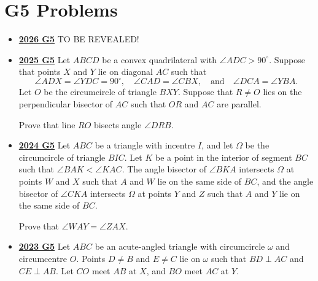 \documentclass[11pt]{scrartcl}
\begin{document}
\section*{G5 Problems}  \label{G5}
\begin{itemize}[leftmargin=*]


\item \href{https://www.imo-official.org/assets/documents/problems/2026/IMO2026SL.pdf}{\textbf{2026 G5}} TO BE REVEALED!

\item \href{https://artofproblemsolving.com/community/c6h3866849p38676933}{\textbf{2025 G5}} Let $ABCD$ be a convex quadrilateral with $\angle ADC > 90^\circ$. Suppose that points $X$ and $Y$ lie on diagonal $AC$ such that 
    \[ \angle ADX = \angle YDC = 90^\circ, \quad \angle CAD = \angle CBX, \quad \text{and} \quad \angle DCA = \angle YBA. \]
    Let $O$ be the circumcircle of triangle $BXY$. Suppose that $R\ne O$ lies on the perpendicular bisector of $AC$ such that $OR$ and $AC$ are parallel.

    Prove that line $RO$ bisects angle $\angle DRB$.


\item \href{https://artofproblemsolving.com/community/c6h3610468p35340974}{\textbf{2024 G5}} Let $ABC$ be a triangle with incentre $I$, and let $\Omega$ be the circumcircle of triangle $BIC$. Let $K$ be a point in the interior of segment $BC$ such that $\angle BAK < \angle KAC$. The angle bisector of $\angle BKA$ intersects $\Omega$ at points $W$ and $X$ such that $A$ and $W$ lie on the same side of $BC$, and the angle bisector of $\angle CKA$ intersects $\Omega$ at points $Y$ and $Z$ such that $A$ and $Y$ lie on the same side of $BC$.

Prove that $\angle WAY = \angle ZAX$.
\item \href{https://artofproblemsolving.com/community/c6h3359731p31218385}{\textbf{2023 G5}} Let $ABC$ be an acute-angled triangle with circumcircle $\omega$ and circumcentre $O$. Points $D\neq B$ and $E\neq C$ lie on $\omega$ such that $BD\perp AC$ and $CE\perp AB$. Let $CO$ meet $AB$ at $X$, and $BO$ meet $AC$ at $Y$.


\end{itemize}
\end{document}
